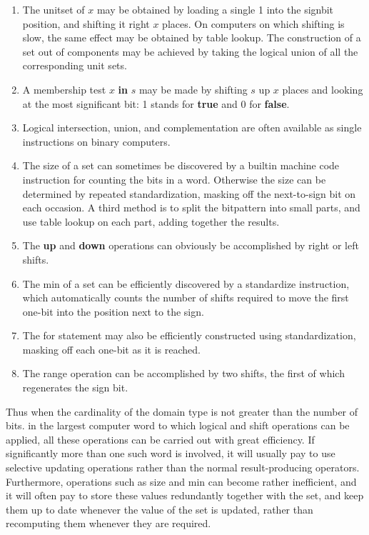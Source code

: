 \begin{enumerate}[leftmargin=2\parindent, label=(\arabic*)]
	\item The unitset of $x$ may be obtained by loading a single 1 into the signbit position, and shifting it right $x$ places. On computers on which shifting is slow, the same effect may be obtained by table lookup. The construction of a set out of components may be achieved by taking the logical union of all the corresponding unit sets.

	\item A membership test $x$ \textbf{in} $s$ may be made by shifting $s$ up $x$ places and looking at the most significant bit: 1 stands for \textbf{true} and 0 for \textbf{false}.

	\item Logical intersection, union, and complementation are often available as single instructions on binary computers.

	\item The size of a set can sometimes be discovered by a builtin machine code instruction for counting the bits in a word. Otherwise the size can be determined by repeated standardization, masking off the next-to-sign bit on each occasion. A third method is to split the bitpattern into small parts, and use table lookup on each part, adding together the results.

	\item The \textbf{up} and \textbf{down} operations can obviously be accomplished by right or left shifts.

	\item The min of a set can be efficiently discovered by a standardize instruction, which automatically counts the number of shifts required to move the first one-bit into the position next to the sign.

	\item The for statement may also be efficiently constructed using standardization, masking off each one-bit as it is reached.

	\item The range operation can be accomplished by two shifts, the first of which regenerates the sign bit.	
\end{enumerate}

Thus when the cardinality of the domain type is not greater than the number of bits. in the largest computer word to which logical and shift operations can be applied, all these operations can be carried out with great efficiency. If significantly more than one such word is involved, it will usually pay to use selective updating operations rather than the normal result-producing operators. Furthermore, operations such as size and min can become rather inefficient, and it will often pay to store these values redundantly together with the set, and keep them up to date whenever the value of the set is updated, rather than recomputing them whenever they are required.

